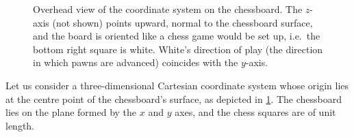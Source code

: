 \documentclass[../report.tex]{subfiles}
\begin{document}
\begin{figure}
    \centering
    \caption[The chessboard coordinate system.]{Overhead view of the coordinate system on the chessboard. The $z$-axis (not shown) points upward, normal to the chessboard surface, and the board is oriented like a chess game would be set up, i.e.\ the bottom right square is white. White's direction of play (the direction in which pawns are advanced) coincides with the $y$-axis.}
    \label{fig:cartesian_chessboard}
\end{figure}
Let us consider a three-dimensional Cartesian coordinate system whose origin lies at the centre point of the chessboard's surface, as depicted in \cref{fig:cartesian_chessboard}. 
The chessboard lies on the plane formed by the $x$ and $y$ axes, and the chess squares are of unit length. 
\end{document}
